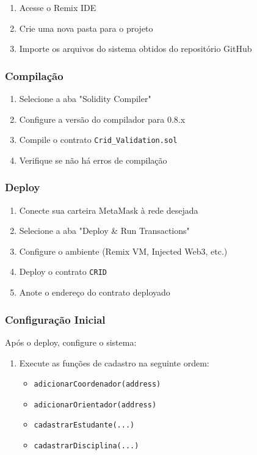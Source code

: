 \documentclass[12pt,a4paper]{article}
\begin{document}
\begin{enumerate}
    \item Acesse o Remix IDE
    \item Crie uma nova pasta para o projeto
    \item Importe os arquivos do sistema obtidos do repositório GitHub
\end{enumerate}

\subsubsection{Compilação}

\begin{enumerate}
    \item Selecione a aba "Solidity Compiler"
    \item Configure a versão do compilador para 0.8.x
    \item Compile o contrato \texttt{Crid\_Validation.sol}
    \item Verifique se não há erros de compilação
\end{enumerate}

\subsubsection{Deploy}

\begin{enumerate}
    \item Conecte sua carteira MetaMask à rede desejada
    \item Selecione a aba "Deploy & Run Transactions"
    \item Configure o ambiente (Remix VM, Injected Web3, etc.)
    \item Deploy o contrato \texttt{CRID}
    \item Anote o endereço do contrato deployado
\end{enumerate}

\subsubsection{Configuração Inicial}

Após o deploy, configure o sistema:

\begin{enumerate}
    \item Execute as funções de cadastro na seguinte ordem:
    \begin{itemize}
        \item \texttt{adicionarCoordenador(address)}
        \item \texttt{adicionarOrientador(address)}
        \item \texttt{cadastrarEstudante(...)}
        \item \texttt{cadastrarDisciplina(...)}
    \end{itemize}
\end{enumerate}
\end{document}

